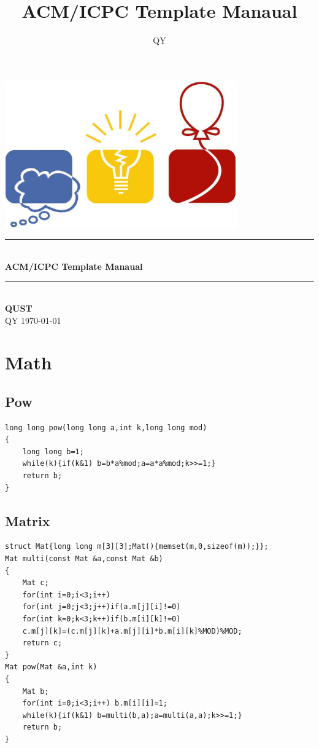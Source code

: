 \documentclass[twoside]{article}
\title{ACM/ICPC Template Manaual}
\author{QY}
\newcommand{\HRule}{\rule{\linewidth}{0.5mm}}
\begin{document}
\small
\begin{titlepage}
\begin{center}
\vspace*{0.5cm}\includegraphics[width=0.75\textwidth]{logo.jpg} \\ [2cm]
\HRule \\ [1cm]
\textbf{\Huge{ACM/ICPC Template Manaual}} \\ [0.5cm]
\HRule \\ [4cm]
\textbf{\Huge{QUST}} \\ [1cm]
\LARGE{QY}
\vfill
\Large{\today}
\end{center}
\clearpage
\end{titlepage}
\tableofcontents\clearpage
\pagestyle{fancy}
\lfoot{}
\cfoot{\thepage}\rfoot{}
\setcounter{section}{-1}
\setcounter{page}{1}
\clearpage\section{Math}
\subsection{Pow}
\begin{lstlisting}
long long pow(long long a,int k,long long mod)
{
    long long b=1;
    while(k){if(k&1) b=b*a%mod;a=a*a%mod;k>>=1;}
    return b;
}
\end{lstlisting}
\subsection{Matrix}
\begin{lstlisting}
struct Mat{long long m[3][3];Mat(){memset(m,0,sizeof(m));}};
Mat multi(const Mat &a,const Mat &b)
{
    Mat c;
    for(int i=0;i<3;i++)
    for(int j=0;j<3;j++)if(a.m[j][i]!=0)
    for(int k=0;k<3;k++)if(b.m[i][k]!=0)
    c.m[j][k]=(c.m[j][k]+a.m[j][i]*b.m[i][k]%MOD)%MOD;
    return c;
}
Mat pow(Mat &a,int k)
{
    Mat b;
    for(int i=0;i<3;i++) b.m[i][i]=1;
    while(k){if(k&1) b=multi(b,a);a=multi(a,a);k>>=1;}
    return b;
}
\end{lstlisting}
\end{document}
